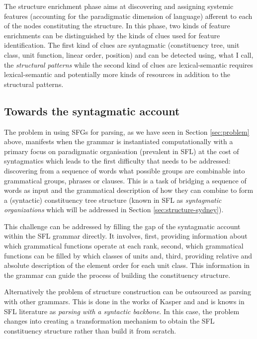 The structure enrichment phase aims at discovering and assigning systemic features (accounting for the paradigmatic dimension of language) afferent to each of the nodes constituting the structure. In this phase, two kinds of feature enrichments can be distinguished by the kinds of clues used for feature identification. The first kind of clues are syntagmatic (constituency tree, unit class, unit function, linear order, position) and can be detected using, what I call, the \textit{structural patterns} while the second kind of clues are lexical-semantic requires lexical-semantic and potentially more kinds of resources in addition to the structural patterns.

\subsection{Towards the syntagmatic account}
\label{sec:syntagmatic-account}
The problem in using SFGs for parsing, as we have seen in Section \ref{sec:problem} above, manifests when the grammar is instantiated computationally with a primary focus on paradigmatic organisation (prevalent in SFL) at the cost of syntagmatics which leads to the first difficulty that needs to be addressed: discovering from a sequence of words what possible groups are combinable into grammatical groups, phrases or clauses. This is a task of bridging a sequence of words as input and the grammatical description of how they can combine to form a (syntactic) constituency tree structure (known in SFL as \textit{syntagmatic organizations} which will be addressed in Section \ref{sec:structure-sydney}). 

This challenge can be addressed by filling the gap of the syntagmatic account within the SFL grammar directly. It involves, first, providing information about which grammatical functions operate at each rank, second, which grammatical functions can be filled by which classes of units and, third, providing relative and absolute description of the element order for each unit class. This information in the grammar can guide the process of building the constituency structure. 

Alternatively the problem of structure construction can be outsourced as parsing with other grammars. This is done in the works of Kasper \citet{Kasper1988} and \citet{Honnibal2004a, Honnibal2007} and is knows in SFL literature as \textit{parsing with a syntactic backbone}. In this case, the problem changes into creating a transformation mechanism to obtain the SFL constituency structure rather than build it from scratch. 


